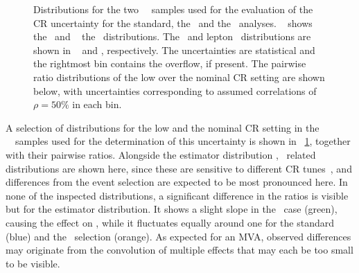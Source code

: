 \begin{figure}[tbp!]
{	\label{sfig:CRleppt}
}
\caption[Investigation of \gls{CR} effects]{
%
Distributions for the two \Atlfast\ \PowhegPythia\ samples used for the evaluation of the \gls{CR} uncertainty for the standard, the \cutbased\ and the \mvabased\ analyses. 
%
\Fig~ shows the \mlbr\ and \fig~ the \ptlb\ distributions.
%
The \bjet\ and lepton \pt\ distributions are shown in ~ and , respectively.
%
The uncertainties are statistical and the rightmost bin contains the overflow, if present.
%
The pairwise ratio distributions of the low over the nominal \gls{CR} setting are shown below, with uncertainties corresponding to assumed correlations of $\rho=50\%$ in each bin.
%
\label{fig:CR_investigation}
}
\end{figure}
%
%
A selection of distributions for the low and the nominal \gls{CR} setting in the \Atlfast\ \PowhegPythia\ samples used for the determination of this uncertainty is shown in \fig~\ref{fig:CR_investigation}, together with their pairwise ratios. 
%
Alongside the estimator distribution \mlbr, \pt\ related distributions are shown here, since these are sensitive to different \gls{CR} tunes~\cite{Skands}, and differences from the event selection are expected to be most pronounced here.
%
%
In none of the inspected distributions, a significant difference in the ratios is visible but for the estimator distribution.
%
It shows a slight slope in the \mvabased\ case (green), causing the effect on \mt, while it fluctuates equally around one for the standard (blue) and the \cutbased\ selection (orange). 
%
As expected for an \gls{MVA}, observed differences may originate from the convolution of multiple effects that may each be too small to be visible.
%
%

